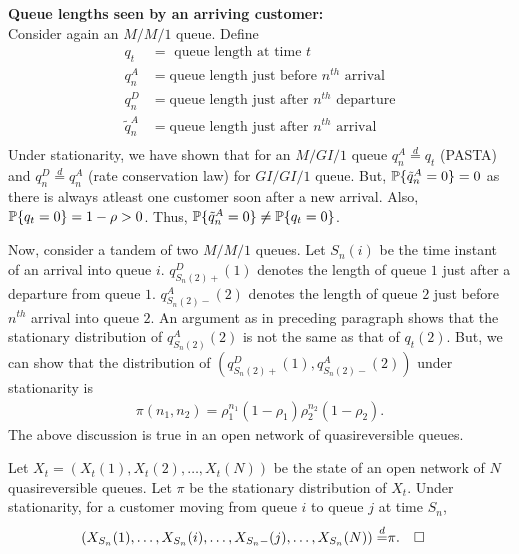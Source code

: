 \documentclass[all-lectures.tex]{subfiles}
\newcommand*{\QEDB}{\hfill\ensuremath{\square}}%
\begin{document}
\noindent \textbf{Queue lengths seen by an arriving customer:} \\
\indent Consider again an $M/M/1$ queue. Define 
\begin{align*}
q_t &= \text{ queue length at time $t$} \\
q_n^A &= \text{queue length just before $n^{th}$ arrival} \\
q_n^D &= \text{queue length just after $n^{th}$ departure} \\
\tilde{q}_n^A &= \text{queue length just after $n^{th}$ arrival} \\
\end{align*}
Under stationarity, we have shown that for an $M/GI/1$ queue $q^A_n \stackrel{d}{=} q_t$ (PASTA) and $q^D_n \stackrel{d}{=} q^A_n$ (rate conservation law) for $GI/GI/1$ queue. But, $\P\{\tilde{q}^A_n = 0\} =0$ as there is always atleast one customer soon after a new arrival. Also, $\P\{q_t = 0\} = 1-\rho > 0$. Thus, $\P\{\tilde{q}^A_n = 0\} \neq \P\{q_t = 0\}$.

Now, consider a tandem of two $M/M/1$ queues. Let $S_n(i)$ be the time instant of an arrival into queue $i$. $q_{S_n(2)+}^D(1)$ denotes the length of queue $1$ just after a departure from queue $1$. $q_{S_n(2)-}^A(2)$ denotes the length of queue $2$ just before $n^{th}$ arrival into queue $2$. An argument as in preceding paragraph shows that the stationary distribution of $q^A_{S_n(2)}(2)$ is not the same as that of $q_t(2)$. But, we can show that the distribution of $\left(q_{S_n(2)+}^D(1),q_{S_n(2)-}^A(2)\right)$ under stationarity is 
\begin{align*}
\pi(n_1,n_2) = \rho_1^{n_1} (1-\rho_1) \rho_2^{n_2} (1-\rho_2).
\end{align*}
The above discussion is true in an open network of quasireversible queues. 
\begin{thm}
Let $X_t = (X_t(1),X_t(2),\dots,X_t(N))$ be the state of an open network of $N$ quasireversible queues. Let $\pi$ be the stationary distribution of $X_t$. Under stationarity, for a customer moving from queue $i$ to queue $j$ at time $S_n$,
\begin{align*}
(X_{S_n}(1),\dots,X_{S_n}(i),\dots,X_{S_n-}(j),\dots,X_{S_n}(N)) \stackrel{d}{=}&  \pi. && \QEDB 
\end{align*}
\end{thm}
\end{document}
